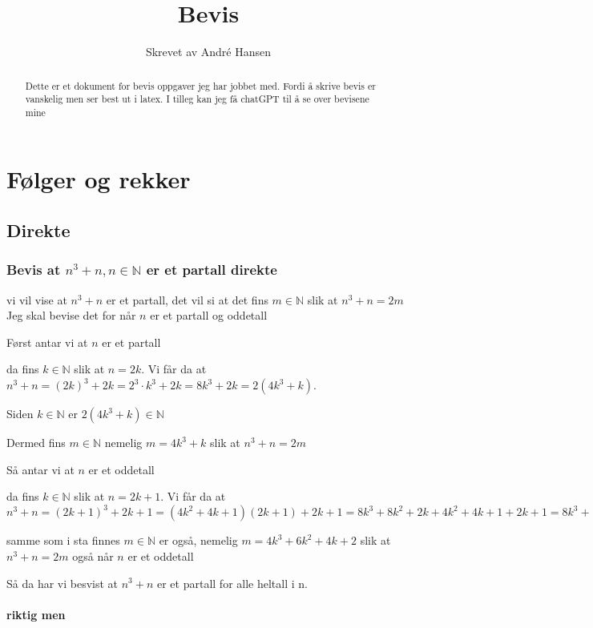 \documentclass{article}
\title{Bevis}
\author{Skrevet av André Hansen}
\begin{document}
\maketitle

\begin{abstract}
Dette er et dokument for bevis oppgaver jeg har jobbet med. Fordi å skrive bevis er vanskelig men ser best ut i latex.
I tilleg kan jeg få chatGPT til å se over bevisene mine
\end{abstract}

\section{Følger og rekker}

\subsection{Direkte}

\subsubsection{Bevis at $n^3+n, n \in \mathbb{N}$ er et partall direkte}


vi vil vise at $n^3+n$ er et partall, det vil si at det fins $m \in \mathbb{N}$ slik at $n^3+n=2m$
Jeg skal bevise det for når $n$ er et partall og oddetall

Først antar vi at $n$ er et partall

da fins $k \in \mathbb{N}$ slik at $n=2k$. Vi får da at $n^3+n=(2k)^3+2k=2^3 \cdot k^3+2k=8k^3+2k=2(4k^3+k)$.

Siden $k \in \mathbb{N}$ er $2(4k^3+k) \in \mathbb{N}$

Dermed fins $m \in \mathbb{N}$ nemelig $m=4k^3+k$ slik at $n^3+n=2m$

Så antar vi at $n$ er et oddetall

da fins $k \in \mathbb{N}$ slik at $n=2k+1$. Vi får da at $n^3+n=(2k+1)^3+2k+1=(4k^2+4k+1)(2k+1)+2k+1=8k^3+8k^2+2k+4k^2+4k+1+2k+1=8k^3+12k^2+8k+2=2(4k^3+6k^2+4k+1)$

samme som i sta finnes $m \in \mathbb{N}$ er også, nemelig $m=4k^3+6k^2+4k+2$ slik at $n^3+n=2m$ også når $n$ er et oddetall

Så da har vi besvist at $n^3+n$ er et partall for alle heltall i n.

\paragraph{riktig men}
\end{document}
